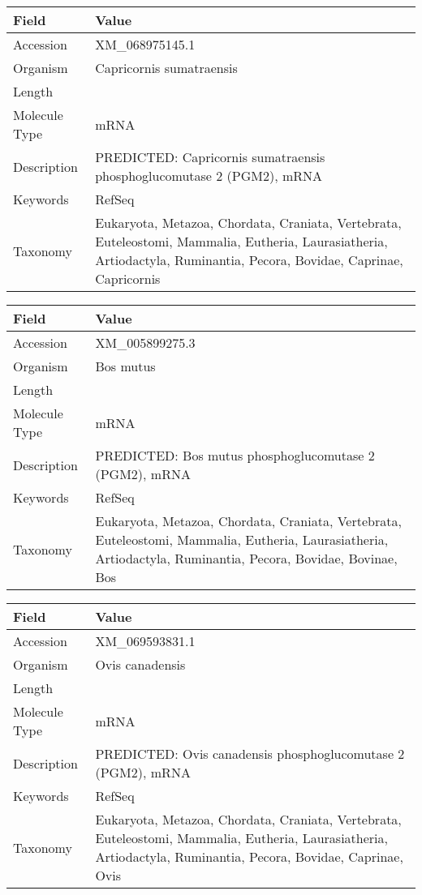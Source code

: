 \documentclass[10pt]{article}
\begin{document}
\vspace{1em}
{\footnotesize
\begin{longtable}{>{\raggedright\arraybackslash}p{4.5cm} >{\raggedright\arraybackslash}p{11.5cm}}
\textbf{Field} & \textbf{Value} \\
\hline
Accession & XM\_068975145.1 \\
Organism & Capricornis sumatraensis \\
Length & 3402 \\
Molecule Type & mRNA \\
Description & PREDICTED: Capricornis sumatraensis phosphoglucomutase 2 (PGM2), mRNA \\
Keywords & RefSeq \\
Taxonomy & Eukaryota, Metazoa, Chordata, Craniata, Vertebrata, Euteleostomi, Mammalia, Eutheria, Laurasiatheria, Artiodactyla, Ruminantia, Pecora, Bovidae, Caprinae, Capricornis \\
\end{longtable}
}

\vspace{1em}
{\footnotesize
\begin{longtable}{>{\raggedright\arraybackslash}p{4.5cm} >{\raggedright\arraybackslash}p{11.5cm}}
\textbf{Field} & \textbf{Value} \\
\hline
Accession & XM\_005899275.3 \\
Organism & Bos mutus \\
Length & 7303 \\
Molecule Type & mRNA \\
Description & PREDICTED: Bos mutus phosphoglucomutase 2 (PGM2), mRNA \\
Keywords & RefSeq \\
Taxonomy & Eukaryota, Metazoa, Chordata, Craniata, Vertebrata, Euteleostomi, Mammalia, Eutheria, Laurasiatheria, Artiodactyla, Ruminantia, Pecora, Bovidae, Bovinae, Bos \\
\end{longtable}
}

\vspace{1em}
{\footnotesize
\begin{longtable}{>{\raggedright\arraybackslash}p{4.5cm} >{\raggedright\arraybackslash}p{11.5cm}}
\textbf{Field} & \textbf{Value} \\
\hline
Accession & XM\_069593831.1 \\
Organism & Ovis canadensis \\
Length & 4203 \\
Molecule Type & mRNA \\
Description & PREDICTED: Ovis canadensis phosphoglucomutase 2 (PGM2), mRNA \\
Keywords & RefSeq \\
Taxonomy & Eukaryota, Metazoa, Chordata, Craniata, Vertebrata, Euteleostomi, Mammalia, Eutheria, Laurasiatheria, Artiodactyla, Ruminantia, Pecora, Bovidae, Caprinae, Ovis \\
\end{longtable}
}
\end{document}
